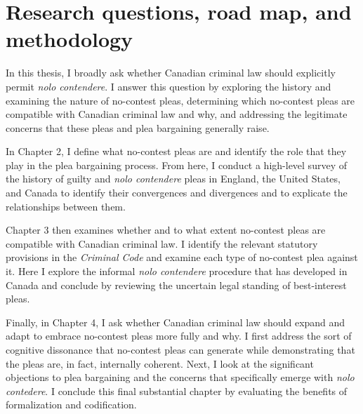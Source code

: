 \section{Research questions, road map, and methodology}

In this thesis, I broadly ask whether Canadian criminal law should explicitly permit \textit{nolo contendere}. I answer this question by exploring the history and examining the nature of no-contest pleas, determining which no-contest pleas are compatible with Canadian criminal law and why, and addressing the legitimate concerns that these pleas and plea bargaining generally raise.

In Chapter 2, I define what no-contest pleas are and identify the role that they play in the plea bargaining process. From here, I conduct a high-level survey of the history of guilty and \textit{nolo contendere} pleas in England, the United States, and Canada to identify their convergences and divergences and to explicate the relationships between them. 

Chapter 3 then examines whether and to what extent no-contest pleas are compatible with Canadian criminal law. I identify the relevant statutory provisions in the \textit{Criminal Code} and examine each type of no-contest plea against it. Here I explore the informal \textit{nolo contendere} procedure that has developed in Canada and conclude by reviewing the uncertain legal standing of best-interest pleas.

Finally, in Chapter 4, I ask whether Canadian criminal law should expand and adapt to embrace no-contest pleas more fully and why. I first address the sort of cognitive dissonance that no-contest pleas can generate while demonstrating that the pleas are, in fact, internally coherent. Next, I look at the significant objections to plea bargaining and the concerns that specifically emerge with \textit{nolo contedere}. I conclude this final substantial chapter by evaluating the benefits of formalization and codification.